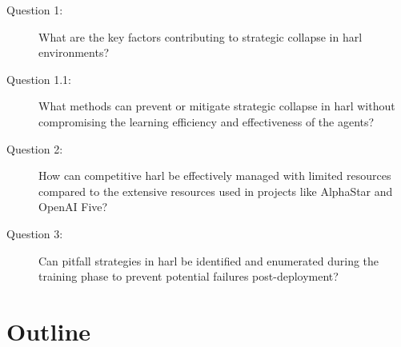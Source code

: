 \begin{description}
    \item[Question 1:] 
    What are the key factors contributing to strategic collapse in \gls{harl} environments?
    \item[Question 1.1:] 
    What methods can prevent or mitigate strategic collapse in \gls{harl} without compromising the 
    learning efficiency and effectiveness of the agents?
    \item[Question 2:] 
    How can competitive \gls{harl} be effectively managed with limited resources compared to the 
    extensive resources used in projects like AlphaStar and OpenAI Five?
    \item[Question 3:] 
    Can pitfall strategies in \gls{harl} be identified and enumerated during the training phase to 
    prevent potential failures post-deployment?
\end{description}


\section{Outline}

